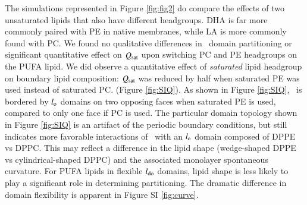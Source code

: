	The simulations represented in Figure \ref{fig:fig2} do compare the effects of two unsaturated lipids that also have different headgroups. DHA is far more commonly paired with PE in native membranes, while LA is more commonly found with PC. We found no qualitative differences in \nachr~domain partitioning or significant quantitative effect on $Q_{\mathrm{sat}}$ upon switching PC and PE headgroups on the PUFA lipid.  We did observe a quantitative effect of \emph{saturated} lipid headgroup on boundary lipid composition: $Q_{\mathrm{sat}}$ was reduced by half when saturated PE was used instead of saturated PC. (Figure \ref{fig:SIQ}).  As shown in Figure \ref{fig:SIQ}, \nachr~is bordered by $l_{\mathrm{o}}$ domains on two opposing faces when saturated PE is used, compared to only one face if PC is used.  %
The particular domain topology shown in Figure \ref{fig:SIQ} is an artifact of the periodic boundary conditions, but still indicates more favorable interactions of \nachr~with an $l_{\mathrm{o}}$ domain composed of DPPE vs DPPC. This may reflect a difference in the lipid shape (wedge-shaped DPPE vs cylindrical-shaped DPPC) and the associated monolayer spontaneous curvature.  For PUFA lipids in flexible $l_{\mathrm{do}}$ domains, lipid shape is less likely to play a significant role in determining partitioning. The dramatic difference in domain flexibility is apparent in  Figure SI \ref{fig:curve}.   %
	
	
